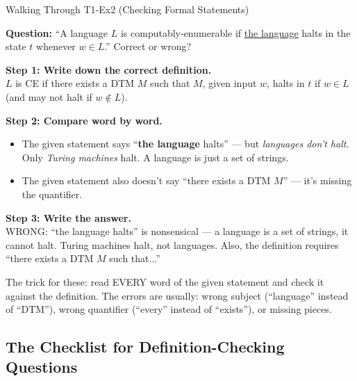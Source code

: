 \documentclass[11pt,a4paper]{article}
\newcommand{\keytakeaway}[1]{%
  \par\vspace{0.3em}%
  \colorbox{yellow!60}{\parbox{\dimexpr\linewidth-2\fboxsep}{#1}}%
  \vspace{0.3em}}
\begin{document}
\begin{examplebox}{Walking Through T1-Ex2 (Checking Formal Statements)}

\textbf{Question:} ``A language $L$ is computably-enumerable if \underline{the language} halts in the state $t$ whenever $w \in L$.'' Correct or wrong?

\textbf{Step 1: Write down the correct definition.}\\
$L$ is CE if there exists a DTM $M$ such that $M$, given input $w$, halts in $t$ if $w \in L$ (and may not halt if $w \notin L$).

\textbf{Step 2: Compare word by word.}
\begin{itemize}
    \item The given statement says ``\textbf{the language} halts'' --- but \emph{languages don't halt}. Only \emph{Turing machines} halt. A language is just a set of strings.
    \item The given statement also doesn't say ``there exists a DTM $M$'' --- it's missing the quantifier.
\end{itemize}

\textbf{Step 3: Write the answer.}\\
WRONG: ``the language halts'' is nonsensical --- a language is a set of strings, it cannot halt. Turing machines halt, not languages. Also, the definition requires ``there exists a DTM $M$ such that...''

\keytakeaway{The trick for these: read EVERY word of the given statement and check it against the definition. The errors are usually: wrong subject (``language'' instead of ``DTM''), wrong quantifier (``every'' instead of ``exists''), or missing pieces.}
\end{examplebox}

\subsection{The Checklist for Definition-Checking Questions}
\end{document}
